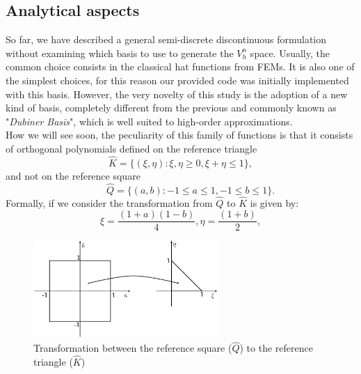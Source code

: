 \documentclass[a4paper,11pt]{article}
\begin{document}
    \subsection{Analytical aspects}\label{analytical_aspects}
    So far, we have described a general semi-discrete discontinuous formulation without examining which basis to use to generate the $V_h^n$ space. Usually, the common choice consists in the classical hat functions from FEMs. It is also one of the simplest choices, for this reason our provided code was initially implemented with this basis. However, the very novelty of this study is the adoption of a new kind of basis, completely different from the previous and commonly known as "\emph{Dubiner Basis}"\cite{dubiner}, which is well suited to high-order approximations. \\
    How we will see soon, the peculiarity of this family of functions is that it consists of orthogonal polynomials defined on the reference triangle
    \begin{equation*}
    \hat{K}=\{ (\xi, \eta) : \xi, \eta \ge 0,	\xi+\eta \le 1 \},
    \end{equation*}
    and not on the reference square
    \begin{equation*}
    \quad \quad \hat{Q}=\{ (a, b) : -1 \le a \le 1, -1 \le b \le 1 \}.
    \end{equation*}
    Formally, if we consider the transformation from $\hat{Q}$ to $\hat{K}$ is given by:
    \begin{equation}\label{transformation_formula}
    \xi=\frac{(1+a)(1-b)}{4},  \eta=\frac{(1+b)}{2},
    \end{equation}
    
    \begin{figure}[h]
    \begin{center}
    \includegraphics[width = 7cm]{./transformation.png}
    	\caption{Transformation between the reference square ($\hat{Q}$) to the reference triangle ($\hat{K}$)}
    	\label{transformation}
    \end{center}
    \end{figure}
    
\end{document}
